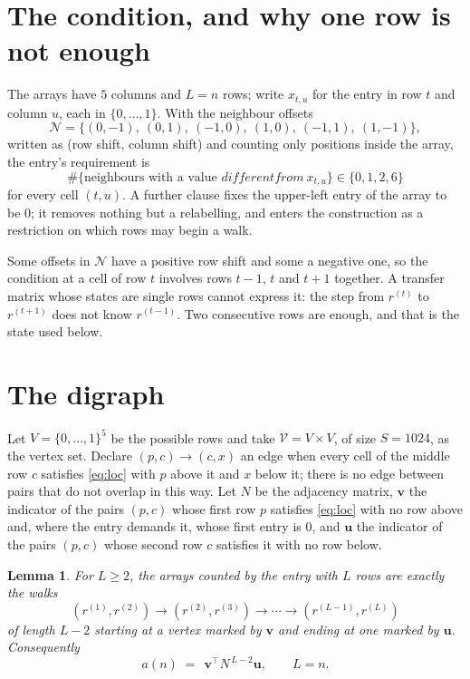 \documentclass[11pt,a4paper]{article}
\theoremstyle{plain}
\newtheorem{lemma}[theorem]{Lemma}
\theoremstyle{definition}
\begin{document}
\section{The condition, and why one row is not enough}

The arrays have $5$ columns and $L=n$ rows; write $x_{t,u}$ for the entry in
row $t$ and column $u$, each in $\{0,\dots,1\}$. With the neighbour offsets
\[
\mathcal N=\{(0,-1),\ (0,1),\ (-1,0),\ (1,0),\ (-1,1),\ (1,-1)\},
\]
written as (row shift, column shift) and counting only positions inside the array, the
entry's requirement is
\begin{equation}\label{eq:loc}
\#\{\text{neighbours with a value }different from\ x_{t,u}\}\in\{0,1,2,6\}
\end{equation}
for every cell $(t,u)$. A further clause fixes the upper-left entry of the array to be $0$; it removes nothing but a relabelling, and enters the construction as a restriction on which rows may begin a walk.

Some offsets in $\mathcal N$ have a positive row shift and some a negative one, so the
condition at a cell of row $t$ involves rows $t-1$, $t$ and $t+1$ together. A transfer
matrix whose states are single rows cannot express it: the step from $r^{(t)}$ to
$r^{(t+1)}$ does not know $r^{(t-1)}$. Two consecutive rows are enough, and that is
the state used below.

\section{The digraph}

Let $V=\{0,\dots,1\}^{5}$ be the possible rows and take
$\mathcal V=V\times V$, of size $S=1024$, as the vertex set. Declare $(p,c)\to(c,x)$ an edge
when every cell of the middle row $c$ satisfies \eqref{eq:loc} with $p$ above it and $x$
below it; there is no edge between pairs that do not overlap in this way. Let $N$ be the
adjacency matrix, $\mathbf{v}$ the indicator of the pairs $(p,c)$ whose first row $p$
satisfies \eqref{eq:loc} with no row above and, where the entry demands it, whose first entry is $0$, and $\mathbf{u}$ the indicator of
the pairs $(p,c)$ whose second row $c$ satisfies it with no row below.

\begin{lemma}\label{lem:walk}
For $L\ge2$, the arrays counted by the entry with $L$ rows are exactly the walks
\[
(r^{(1)},r^{(2)})\to(r^{(2)},r^{(3)})\to\cdots\to(r^{(L-1)},r^{(L)})
\]
of length $L-2$ starting at a vertex marked by $\mathbf{v}$ and ending at one marked by
$\mathbf{u}$. Consequently
\[
a(n)\;=\;\,\mathbf{v}^{\!\top}N^{\,L-2}\mathbf{u},\qquad L=n .
\]
\end{lemma}
\end{document}
